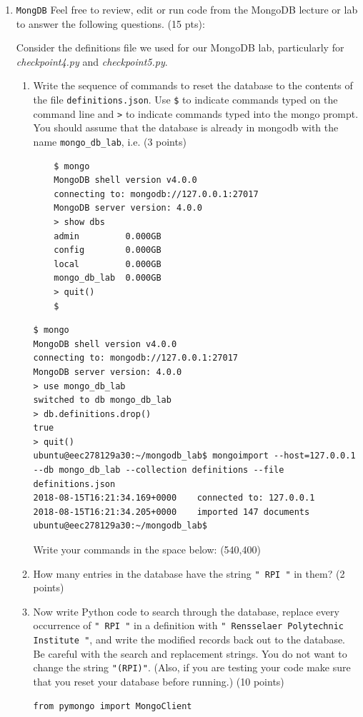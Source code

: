 \documentclass[10pt]{article}
\begin{document}
\begin{enumerate}
\newpage

\item \texttt{MongDB} Feel free to review, edit or run code from the MongoDB lecture or lab to answer the following questions. (15 pts):

	Consider the definitions file we used for our MongoDB lab, particularly for \textit{checkpoint4.py} and \textit{checkpoint5.py}. 
	\begin{enumerate}
	\item Write the sequence of commands to reset the database to the contents of the file \verb|definitions.json|. Use \verb|$| to indicate commands typed on the command line and \verb|>| to indicate commands typed into the mongo prompt. You should assume that the database is already in mongodb with the name \verb|mongo_db_lab|, i.e. (3 points)
	\begin{verbatim}
	$ mongo
	MongoDB shell version v4.0.0
	connecting to: mongodb://127.0.0.1:27017
	MongoDB server version: 4.0.0
	> show dbs
	admin         0.000GB
	config        0.000GB
	local         0.000GB
	mongo_db_lab  0.000GB
	> quit()
	$
	\end{verbatim}
\beginanswers
\begin{verbatim}
$ mongo
MongoDB shell version v4.0.0
connecting to: mongodb://127.0.0.1:27017
MongoDB server version: 4.0.0
> use mongo_db_lab
switched to db mongo_db_lab
> db.definitions.drop()
true
> quit()
ubuntu@eec278129a30:~/mongodb_lab$ mongoimport --host=127.0.0.1 --db mongo_db_lab --collection definitions --file definitions.json
2018-08-15T16:21:34.169+0000	connected to: 127.0.0.1
2018-08-15T16:21:34.205+0000	imported 147 documents
ubuntu@eec278129a30:~/mongodb_lab$ 
\end{verbatim}
\else
Write your commands in the space below:
\hspace*{-0.4in}\framebox(540,400){}
\fi

\newpage
\item How many entries in the database have the string \verb|" RPI "| in them? (2 points)
\beginanswers
{}
\bigskip
\else
\bigskip
\bigskip
\bigskip
\fi

\item Now write Python code to search through the database, replace every occurrence of \verb|" RPI "| in a definition with \verb|" Rensselaer Polytechnic Institute "|, and write the modified records back out to the database. Be careful with the search and replacement strings. You do not want to change the string \verb|"(RPI)"|. (Also, if you are testing your code make sure that you reset your database before running.) (10 points)
\beginanswers
\begin{verbatim}
from pymongo import MongoClient


\end{verbatim}
\end{enumerate}
\end{enumerate}
\end{document}
